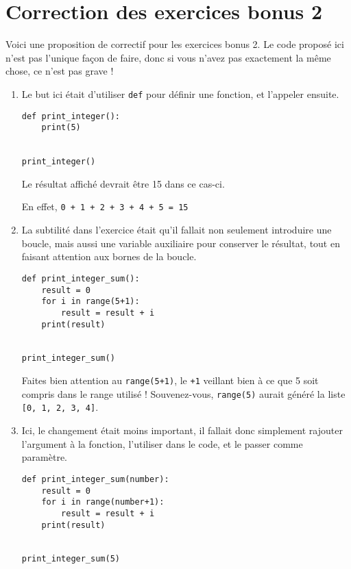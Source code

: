 \documentclass[12pt,a4paper]{article}
\newcommand{\codeintext}[1]{\texttt{#1}}
\begin{document}
\section*{Correction des exercices bonus 2}

Voici une proposition de correctif pour les exercices bonus 2. Le code proposé ici n'est pas l'unique façon de faire, donc si vous n'avez pas exactement la même chose, ce n'est pas grave !

\begin{enumerate}

\item Le but ici était d'utiliser \codeintext{def} pour définir une fonction, et l'appeler ensuite.
\begin{lstlisting}
def print_integer():
    print(5)


print_integer()
\end{lstlisting}
Le résultat affiché devrait être 15 dans ce cas-ci.

En effet, \codeintext{0 + 1 + 2 + 3 + 4 + 5 = 15}

\item La subtilité dans l'exercice était qu'il fallait non seulement introduire une boucle, mais aussi une variable auxiliaire pour conserver le résultat, tout en faisant attention aux bornes de la boucle.

\begin{lstlisting}
def print_integer_sum():
    result = 0
    for i in range(5+1):
        result = result + i
    print(result)


print_integer_sum()
\end{lstlisting}

Faites bien attention au \codeintext{range(5+1)}, le \codeintext{+1} veillant bien à ce que 5 soit compris dans le range utilisé ! Souvenez-vous, \codeintext{range(5)} aurait généré la liste \codeintext{[0, 1, 2, 3, 4]}.

\newpage

\item Ici, le changement était moins important, il fallait donc simplement rajouter l'argument à la fonction, l'utiliser dans le code, et le passer comme paramètre. 

\begin{lstlisting}
def print_integer_sum(number):
    result = 0
    for i in range(number+1):
        result = result + i
    print(result)


print_integer_sum(5)
\end{lstlisting}



\end{enumerate}
\end{document}
